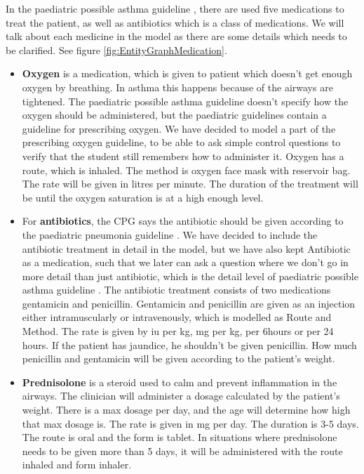 In the paediatric possible asthma guideline \parencite{RepublicofKeny2016}, there are used five medications to treat the patient, as well as antibiotics which is a class of medications. We will talk about each medicine in the model as there are some details which needs to be clarified. See figure \ref{fig:EntityGraphMedication}.


\begin{itemize}
	\item \textbf{Oxygen} is a medication, which is given to patient which doesn't get enough oxygen by breathing. In asthma this happens because of the airways are tightened. The paediatric possible asthma guideline \parencite{RepublicofKeny2016} doesn't specify how the oxygen should be administered, but the paediatric guidelines contain a guideline for prescribing oxygen\parencite{RepublicofKeny2016}. We have decided to model a part of the prescribing oxygen guideline, to be able to ask simple control questions to verify that the student still remembers how to administer it. Oxygen has a route, which is inhaled. The method is oxygen face mask with reservoir bag. The rate will be given in litres per minute. The duration of the treatment will be until the oxygen saturation is at a high enough level.
	
	\item For \textbf{antibiotics}, the CPG says the antibiotic should be given according to the paediatric pneumonia guideline \parencite{RepublicofKeny2016}. We have decided to include the antibiotic treatment in detail in the model, but we have also kept Antibiotic as a medication, such that we later can ask a question where we don't go in more detail than just antibiotic, which is the detail level of paediatric possible asthma guideline \parencite{RepublicofKeny2016}. The antibiotic treatment consists of two medications gentamicin and penicillin. Gentamicin and penicillin are given as an injection either intramuscularly or intravenously, which is modelled as Route and Method. The rate is given by iu per kg, mg per kg, per 6hours or per 24 hours. If the patient has jaundice, he shouldn't be given penicillin. How much penicillin and gentamicin will be given according to the patient's weight.
	
	\item \textbf{Prednisolone} is a steroid used to calm and prevent inflammation in the airways. The clinician will administer a dosage calculated by the patient's weight. There is a max dosage per day, and the age will determine how high that max dosage is. The rate is given in mg per day. The duration is 3-5 days. The route is oral and the form is tablet. In situations where prednisolone needs to be given more than 5 days, it will be administered with the route inhaled and form inhaler.
	

\end{itemize}
